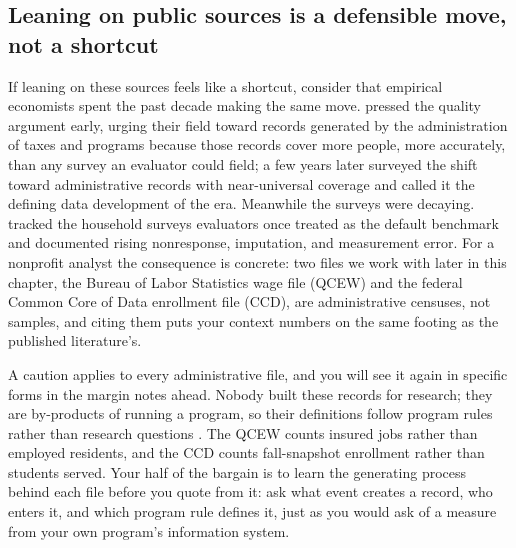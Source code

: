 \subsection{Leaning on public sources is a defensible move, not a shortcut}\label{ch03-defensible}
If leaning on these sources feels like a shortcut, consider that empirical economists spent the past decade making the same move. \textcite{card2010administrative} pressed the quality argument early, urging their field toward records generated by the administration of taxes and programs because those records cover more people, more accurately, than any survey an evaluator could field; a few years later \textcite{einav2014bigdata} surveyed the shift toward administrative records with near-universal coverage and called it the defining data development of the era. Meanwhile the surveys were decaying. \textcite{meyer2015surveys} tracked the household surveys evaluators once treated as the default benchmark and documented rising nonresponse, imputation, and measurement error. For a nonprofit analyst the consequence is concrete: two files we work with later in this chapter, the Bureau of Labor Statistics wage file (QCEW) and the federal Common Core of Data enrollment file (CCD), are administrative censuses, not samples, and citing them puts your context numbers on the same footing as the published literature's.

A caution applies to every administrative file, and you will see it again in specific forms in the margin notes ahead. Nobody built these records for research; they are by-products of running a program, so their definitions follow program rules rather than research questions \parencite{connelly2016administrative}. The QCEW counts insured jobs rather than employed residents, and the CCD counts fall-snapshot enrollment rather than students served. Your half of the bargain is to learn the generating process behind each file before you quote from it: ask what event creates a record, who enters it, and which program rule defines it, just as you would ask of a measure from your own program's information system.

